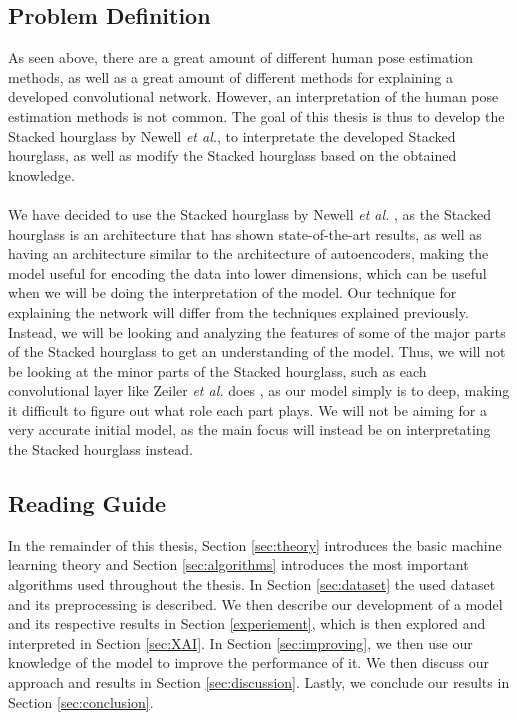 \documentclass[./main.tex]{subfiles}
\begin{document}
\subsection{Problem Definition}
As seen above, there are a great amount of different human pose estimation methods, as well as a great amount of different methods for explaining a developed convolutional network. However, an interpretation of the human pose estimation methods is not common. The goal of this thesis is thus to develop the Stacked hourglass by Newell \textit{et al.}\cite{Newell}, to interpretate the developed Stacked hourglass, as well as modify the Stacked hourglass based on the obtained knowledge.
\\
\\
We have decided to use the Stacked hourglass by Newell \textit{et al.} \cite{Newell}, as the Stacked hourglass is an architecture that has shown state-of-the-art results, as well as having an architecture similar to the architecture of autoencoders, making the model useful for encoding the data into lower dimensions, which can be useful when we will be doing the interpretation of the model. Our technique for explaining the network will differ from the techniques explained previously. Instead, we will be looking and analyzing the features of some of the major parts of the Stacked hourglass to get an understanding of the model. Thus, we will not be looking at the minor parts of the Stacked hourglass, such as each convolutional layer like Zeiler \textit{et al.} does \cite{Zeiler}, as our model simply is to deep, making it difficult to figure out what role each part plays. We will not be aiming for a very accurate initial model, as the main focus will instead be on interpretating the Stacked hourglass instead.

\subsection{Reading Guide}
In the remainder of this thesis, Section \ref{sec:theory} introduces the basic machine learning theory and Section \ref{sec:algorithms} introduces the most important algorithms used throughout the thesis. In Section \ref{sec:dataset} the used dataset and its preprocessing is described. We then describe our development of a model and its respective results in Section \ref{experiement}, which is then explored and interpreted in Section \ref{sec:XAI}. In Section \ref{sec:improving}, we then use our knowledge of the model to improve the performance of it. We then discuss our approach and results in Section \ref{sec:discussion}. Lastly, we conclude our results in Section \ref{sec:conclusion}.
\end{document}
